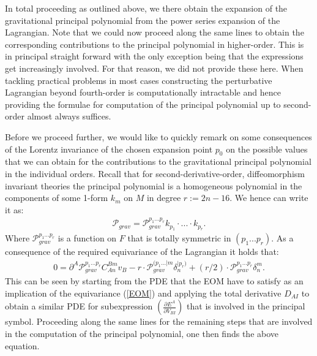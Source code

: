 In total proceeding as outlined above, we there obtain the expansion of the gravitational principal polynomial from the power series expansion of the Lagrangian.
Note that we could now proceed along the same lines to obtain the corresponding contributions to the principal polynomial in higher-order. This is in principal straight forward with the only exception being that the expressions get increasingly involved. For that reason, we did not provide these here. When tackling practical problems in most cases constructing the perturbative Lagrangian beyond fourth-order is computationally intractable and hence providing the formulae for computation of the principal polynomial up to second-order almost always suffices.

Before we proceed further, we would like to quickly remark on some consequences of the Lorentz invariance of the chosen expansion point $p_0$ on the possible values that we can obtain for the contributions to the gravitational principal polynomial in the individual orders. Recall that for second-derivative-order, diffeomorphism invariant theories the principal polynomial is a homogeneous polynomial in the components of some 1-form $k_m$ on $M$ in degree $r := 2n-16$. We hence can write it as:
\begin{align}
    \mathcal{P}_{grav} = \mathcal{P}_{grav}^{{p_1}...{p_{r}}} k_{p_1} \cdot ... \cdot k_{p_r}.
\end{align}
Where $\mathcal{P}_{grav}^{{p_1}...{p_r}}$ is a function on $F$ that is totally symmetric in $(p_1...p_r)$. As a consequence of the required equivariance of the Lagrangian it holds that:
\begin{align}\label{polyEqn}
    0 = \partial^A\mathcal{P}_{grav}^{{p_1}...{p_r}}C_{An}^{Bm}v_B - r \cdot \mathcal{P}_{grav}^{({p_1}...\vert m} \delta_{n}^{\vert p_r) }  + (r/2) \cdot \mathcal{P}_{grav}^{{p_1}...{p_r}} \delta^m_n.
\end{align}
%
%
%
This can be seen by starting from the PDE that the EOM have to satisfy as an implication of the equivariance (\ref{EOM}) and applying the total derivative $D_{AI}$ to obtain a similar PDE for subexpression $\left ( \frac{\partial E^A}{\partial V_{BI}} \right )$ that is involved in the principal symbol. Proceeding along the same lines for the remaining steps that are involved in the computation of the principal polynomial, one then finds the above equation. 


